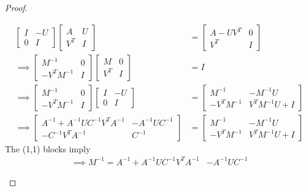 \documentclass{article}
\begin{document}
\begin{proof}
\begin{tcolorbox}[
      colback=white,colframe=black,width=14cm,arc=3mm, auto outer arc]
  \end{tcolorbox}
  \begin{tcolorbox}[
      colback=white,colframe=black,width=14cm,arc=3mm, auto outer arc]
    \begin{align*}
      \begin{bmatrix}
        I & -U \\
        0 & I
      \end{bmatrix}
      \begin{bmatrix}
        A   & U \\
        V^T & I
      \end{bmatrix}
       & =
      \begin{bmatrix}
        A-UV^T & 0 \\
        V^T    & I
      \end{bmatrix} \\
      \implies
      \begin{bmatrix}
        M^{-1}     & 0 \\
        -V^TM^{-1} & I
      \end{bmatrix}
      \begin{bmatrix}
        M   & 0 \\
        V^T & I
      \end{bmatrix}
       & =I                      \\
      \implies
      \begin{bmatrix}
        M^{-1}     & 0 \\
        -V^TM^{-1} & I
      \end{bmatrix}
      \begin{bmatrix}
        I & -U \\
        0 & I
      \end{bmatrix}
       & =
      \begin{bmatrix}
        M^{-1}     & -M^{-1}U     \\
        -V^TM^{-1} & V^TM^{-1}U+I
      \end{bmatrix} \\
      \implies
      \begin{bmatrix}
        A^{-1}+A^{-1}UC^{-1}V^TA^{-1} & -A^{-1}UC^{-1} \\
        -C^{-1}V^TA^{-1}              & C^{-1}
      \end{bmatrix}
       & =
      \begin{bmatrix}
        M^{-1}     & -M^{-1}U     \\
        -V^TM^{-1} & V^TM^{-1}U+I
      \end{bmatrix}
    \end{align*}
    The (1,1) blocks imply
    \begin{align}
      \implies
      M^{-1}=A^{-1}+A^{-1}UC^{-1}V^TA^{-1} & -A^{-1}UC^{-1}
    \end{align}
  \end{tcolorbox}
\end{proof}
\end{document}

